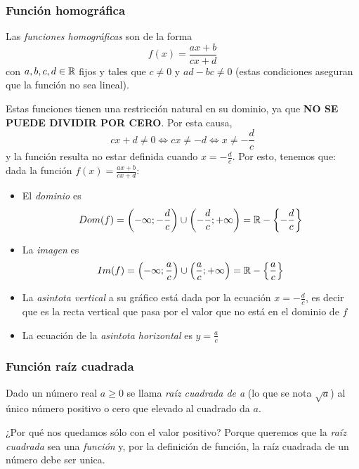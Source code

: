 \documentclass[../teoria.root.tex]{subfiles}
\begin{document}
\subsubsection{Función homográfica}
Las \textit{funciones homográficas} son de la forma \[f(x)=\frac{ax+b}{cx+d}\] con \(a,b,c,d \in \mathbb{R}\) fijos y tales que \(c\neq0\) y \(ad-bc\neq0\) (estas condiciones aseguran que la función no sea lineal).
\begin{center}
\end{center}
Estas funciones tienen una restricción natural en su dominio, ya que \textbf{NO SE PUEDE DIVIDIR POR CERO}.
Por esta causa, \[cx+d\neq0\Longleftrightarrow cx\neq-d\Longleftrightarrow x\neq-\frac{d}{c}\] y la función resulta no estar definida cuando \(x=-\frac{d}{c}\).
Por esto, tenemos que:
dada la función \(f(x)=\frac{ax+b}{cx+d}\):
\begin{itemize}
	\item El \textit{dominio} es \[Dom(f)=\left(-\infty;-\frac{d}{c}\right)\cup\left(-\frac{d}{c};+\infty\right)=\mathbb{R}-\left\{-\frac{d}{c}\right\}\]
	\item La \textit{imagen} es \[Im(f)=\left(-\infty;\frac{a}{c}\right)\cup\left(\frac{a}{c};+\infty\right)=\mathbb{R}-\left\{\frac{a}{c}\right\}\]
	\item La \textit{asintota vertical} a su gráfico está dada por la ecuación \(x=-\frac{d}{c}\), es decir que es la recta vertical que pasa por el valor que no está en el dominio de \(f\)
	\item La ecuación de la \textit{asintota horizontal} es \(y=\frac{a}{c}\)
\end{itemize}
\subsubsection{Función raíz cuadrada}
Dado un número real \(a\geq0\) se llama \textit{raíz cuadrada de a} (lo que se nota \(\sqrt{a}\)) al único número positivo o cero que elevado al cuadrado da \(a\).
\begin{center}
\end{center}
¿Por qué nos quedamos sólo con el valor positivo? Porque queremos que la \textit{raíz cuadrada} sea una \textit{función} y, por la definición de función, la raíz cuadrada de un número debe ser unica.
\end{document}
